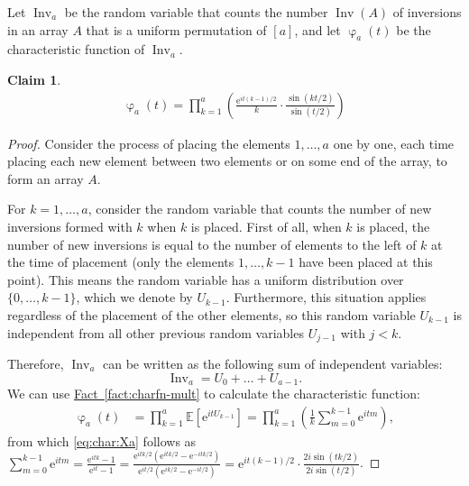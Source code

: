 \documentclass[11pt]{article}
\numberwithin{equation}{section}
\newtheorem{claim}[theorem]{Claim}
\theoremstyle{definition}
\theoremstyle{plain}
\newcommand{\eee}{\mathrm e}
\newcommand{\expref}[2]{\hyperref[#2]{#1~\ref{#2}}}
\newcommand{\UniformD}{U}
\newcommand{\InvD}{\Inv}
\DeclareMathOperator{\charfn}{\varphi}
\DeclareMathOperator{\Inv}{Inv}
\begin{document}
Let $\InvD_a$ be the random variable that counts the number $\Inv(A)$ of inversions in an array $A$ that is a uniform permutation of $[a]$, and let $\charfn_a(t)$ be the characteristic function of $\InvD_a$.
\begin{claim}
    \label{claim:inversion-charfn}
    \begin{align}\label{eq:char:Xa}
    \charfn_a(t)=\prod_{k=1}^{a}\left(\frac{\eee^{it(k-1)/2}}{k}\cdot\frac{\sin(kt/2)}{\sin(t/2)}\right) 
    \end{align}
\end{claim}
\begin{proof}
Consider the process of placing the elements $1,\dots,a$ one by one, each time placing each new element between two elements or on some end of the array, to form an array $A$. 

For $k=1,\dots,a$, consider the random variable that counts the number of new inversions formed with $k$ when $k$ is placed. First of all, when $k$ is placed, the number of new inversions is equal to the number of elements to the left of $k$ at the time of placement (only the elements $1,\dots,k-1$ have been placed at this point). This means the random variable has a uniform distribution over $\{0,\dots,k-1\}$, which we denote by $U_{k-1}$. Furthermore, this situation applies regardless of the placement of the other elements, so this random variable $U_{k-1}$ is independent from all other previous random variables $U_{j-1}$ with $j<k$. 

Therefore, $\InvD_a$ can be written as the following sum of independent variables:
\[\InvD_a = \UniformD_0 + \dots + \UniformD_{a-1}. \]
We can use \expref{Fact}{fact:charfn-mult} to calculate the characteristic function:
\begin{align*}
\charfn_a(t)&=\prod_{k=1}^{a} \mathbb{E}[\eee^{itU_{k-1}}]=\prod_{k=1}^{a}\left(\frac{1}{k}\sum_{m=0}^{k-1} \eee^{itm}\right),
\end{align*}
from which \eqref{eq:char:Xa} follows as
$\sum_{m=0}^{k-1} \eee^{itm} 
= \frac{\eee^{itk}-1}{\eee^{it}-1} 
= \frac{\eee^{itk/2}(\eee^{itk/2}-\eee^{-itk/2})}{\eee^{it/2}(\eee^{ik/2}-\eee^{-it/2})} 
= \eee^{it(k-1)/2} \cdot \frac{2i\sin(tk/2)}{2i\sin(t/2)}$.
\end{proof}
\end{document}
